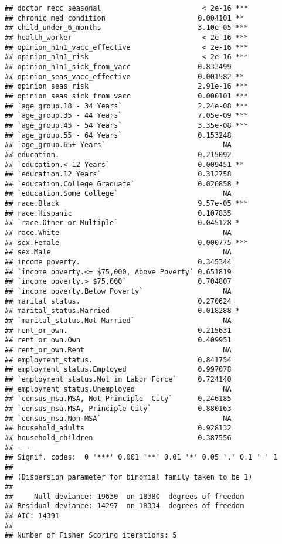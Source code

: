 \documentclass[
]{article}
\begin{document}
\begin{verbatim}
## doctor_recc_seasonal                        < 2e-16 ***
## chronic_med_condition                      0.004101 ** 
## child_under_6_months                       3.10e-05 ***
## health_worker                               < 2e-16 ***
## opinion_h1n1_vacc_effective                 < 2e-16 ***
## opinion_h1n1_risk                           < 2e-16 ***
## opinion_h1n1_sick_from_vacc                0.833499    
## opinion_seas_vacc_effective                0.001582 ** 
## opinion_seas_risk                          2.91e-16 ***
## opinion_seas_sick_from_vacc                0.000101 ***
## `age_group.18 - 34 Years`                  2.24e-08 ***
## `age_group.35 - 44 Years`                  7.05e-09 ***
## `age_group.45 - 54 Years`                  3.35e-08 ***
## `age_group.55 - 64 Years`                  0.153248    
## `age_group.65+ Years`                            NA    
## education.                                 0.215092    
## `education.< 12 Years`                     0.009451 ** 
## `education.12 Years`                       0.312758    
## `education.College Graduate`               0.026858 *  
## `education.Some College`                         NA    
## race.Black                                 9.57e-05 ***
## race.Hispanic                              0.107835    
## `race.Other or Multiple`                   0.045128 *  
## race.White                                       NA    
## sex.Female                                 0.000775 ***
## sex.Male                                         NA    
## income_poverty.                            0.345344    
## `income_poverty.<= $75,000, Above Poverty` 0.651819    
## `income_poverty.> $75,000`                 0.704807    
## `income_poverty.Below Poverty`                   NA    
## marital_status.                            0.270624    
## marital_status.Married                     0.018288 *  
## `marital_status.Not Married`                     NA    
## rent_or_own.                               0.215631    
## rent_or_own.Own                            0.409951    
## rent_or_own.Rent                                 NA    
## employment_status.                         0.841754    
## employment_status.Employed                 0.997078    
## `employment_status.Not in Labor Force`     0.724140    
## employment_status.Unemployed                     NA    
## `census_msa.MSA, Not Principle  City`      0.246185    
## `census_msa.MSA, Principle City`           0.880163    
## `census_msa.Non-MSA`                             NA    
## household_adults                           0.928132    
## household_children                         0.387556    
## ---
## Signif. codes:  0 '***' 0.001 '**' 0.01 '*' 0.05 '.' 0.1 ' ' 1
## 
## (Dispersion parameter for binomial family taken to be 1)
## 
##     Null deviance: 19630  on 18380  degrees of freedom
## Residual deviance: 14297  on 18334  degrees of freedom
## AIC: 14391
## 
## Number of Fisher Scoring iterations: 5
\end{verbatim}
\end{document}
